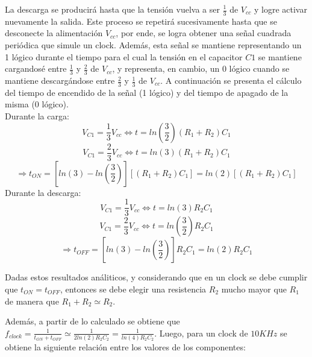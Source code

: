 La descarga se producirá hasta que la tensión vuelva a ser $\frac{1}{3}$
de $V_{cc}$ y logre activar nuevamente la salida. Este proceso se
repetirá sucesivamente hasta que se desconecte la alimentación $V_{cc}$,
por ende, se logra obtener una señal cuadrada periódica que simule
un clock. Además, esta señal se mantiene representando un 1
lógico durante el tiempo para el cual la tensión en el capacitor $C1$
se mantiene cargandosé entre $\frac{1}{3}$ y $\frac{2}{3}$ de $V_{cc}$,
y representa, en cambio, un 0 lógico cuando se mantiene descargándose
entre $\frac{2}{3}$ y $\frac{1}{3}$ de $V_{cc}$. A continuación
se presenta el cálculo del tiempo de encendido de la señal (1
lógico) y del tiempo de apagado de la misma (0 lógico).\\
\vspace{5mm}
Durante la carga:
\begin{equation}
V_{C1}=\frac{1}{3}V_{cc}\Longleftrightarrow t=ln(\frac{3}{2})(R_{1}+R_{2})C_{1}    
\end{equation}
\begin{equation}
V_{C1}=\frac{2}{3}V_{cc}\Longleftrightarrow t=ln(3)(R_{1}+R_{2})C_{1}
\end{equation}
\begin{equation}
\Rightarrow t_{ON}=[ln(3)-ln(\frac{3}{2})][(R_{1}+R_{2})C_{1}]=ln(2)[(R_{1}+R_{2})C_{1}]
\end{equation}
\vspace{5mm}
Durante la descarga:
\begin{equation}
V_{C1}=\frac{1}{3}V_{cc}\Longleftrightarrow t=ln(3)R_{2}C_{1}
\end{equation}
\begin{equation}
V_{C1}=\frac{2}{3}V_{cc}\Longleftrightarrow t=ln(\frac{3}{2})R_{2}C_{1}
\end{equation}
\begin{equation}
\Rightarrow t_{OFF}=[ln(3)-ln(\frac{3}{2})]R_{2}C_{1}=ln(2)R_{2}C_{1}
\end{equation}

\vspace{5mm}
Dadas estos resultados análiticos, y considerando que en un clock
se debe cumplir que $t_{ON}=t_{OFF}$, entonces se debe elegir una
resistencia $R_{2}$ mucho mayor que $R_{1}$ de manera que
$R_{1}+R_{2}\simeq R_{2}$.

Además, a partir de lo calculado se obtiene que $f_{clock}=\frac{1}{t_{ON}+t_{OFF}}\simeq\frac{1}{2ln(2)R_{2}C_{2}}=\frac{1}{ln(4)R_{2}C_{2}}$.
Luego, para un clock de $10KHz$ se obtiene la siguiente relación
entre los valores de los componentes:

